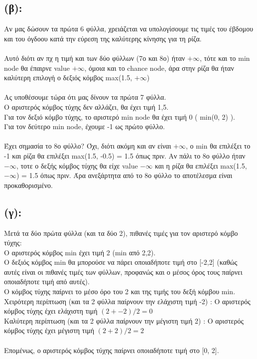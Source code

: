 \documentclass{article}
\begin{document}
\subsection*{(β):}
Αν μας δώσουν τα πρώτα 6 φύλλα,  χρειάζεται να υπολογίσουμε τις τιμές του έβδομου και του όγδοου κατά την εύρεση της καλύτερης κίνησης για τη ρίζα. 
\\ \\
Αυτό διότι αν πχ η τιμή και των δύο φύλλων (7ο και 8ο)
ήταν \(+\infty\), τότε και το \textlatin{min node} θα έπαιρνε \textlatin{value} \(+\infty\), όμοια και το \textlatin{chance node}, άρα στην ρίζα θα ήταν καλύτερη επιλογή ο δεξιός κόμβος \textlatin{max}(1.5, \(+\infty\))
\\ \\ 
Ας υποθέσουμε τώρα ότι μας δίνουν τα πρώτα 7 φύλλα.
\\
Ο αριστερός κόμβος τύχης δεν αλλάζει, θα έχει τιμή 1,5.
\\
Για τον δεξιό κόμβο τύχης, το αριστερό \textlatin{min node} θα έχει τιμή 0 ( \textlatin{min}(0, 2) ).
\\
Για τον δεύτερο \textlatin{min node}, έχουμε -1 ως πρώτο φύλλο.
\\ \\
Έχει σημασία το 8ο φύλλο? Όχι, διότι ακόμη και αν είναι \(+\infty\), ο \textlatin{min} θα επιλέξει το -1 και ρίζα θα επιλέξει \textlatin{max}(1.5, -0.5) = 1.5 όπως πριν.
Αν πάλι το 8ο φύλλο ήταν \(-\infty\), τοτε ο δεξής κόμβος τύχης θα είχε \textlatin{value} \(-\infty\) και η ρίζα θα επιλέξει \textlatin{max}(1.5, \(-\infty\)) = 1.5 όπως πριν.
Άρα ανεξάρτητα από το 8ο φύλλο το αποτέλεσμα είναι προκαθορισμένο. 

\subsection*{(γ):}
Μετά τα δύο πρώτα φύλλα (και τα δύο 2), πιθανές τιμές για τον αριστερό κόμβο τύχης:\\ 
Ο αριστερός κόμβος \textlatin{min} έχει τιμή 2 (\textlatin{min} από {2,2}). \\
Ο δεξιός κόμβος \textlatin{min} θα μπορούσε να πάρει οποιαδήποτε τιμή στο [-2,2] (καθώς αυτές είναι οι πιθανές τιμές των φύλλων, προφανώς και ο μέσος όρος τους παίρνει οποιαδήποτε τιμή από αυτές). \\
Ο κόμβος τύχης παίρνει το μέσο όρο του 2 και της τιμής του δεξή κόμβου \textlatin{min}.
Χειρότερη περίπτωση (και τα 2 φύλλα παίρνουν την ελάχιστη τιμή -2) : Ο αριστερός κόμβος τύχης έχει ελάχιστη τιμή \((2 + -2)/2 = 0\) \\
Καλύτερη περίπτωση (και τα 2 φύλλα παίρνουν την μέγιστη τιμή 2) : Ο αριστερός κόμβος τύχης έχει μέγιστη τιμή \((2 + 2)/2 = 2\) \\
\\
Επομένως, ο αριστερός κόμβος τύχης παίρνει οποιαδήποτε τιμή στο [0, 2]. \\
\end{document}

